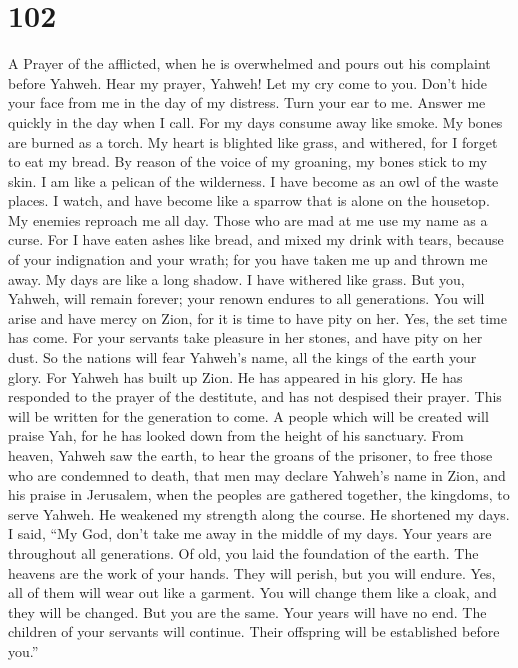\hypertarget{section-92}{%
\section{102}\label{section-92}}

A Prayer of the afflicted, when he is overwhelmed and pours out his
complaint before Yahweh.  Hear my prayer, Yahweh! Let my cry
come to you.  Don't hide your face from me in the day of my
distress. Turn your ear to me. Answer me quickly in the day when I call.
 For my days consume away like smoke. My bones are burned as
a torch.  My heart is blighted like grass, and withered, for
I forget to eat my bread.  By reason of the voice of my
groaning, my bones stick to my skin.  I am like a pelican of
the wilderness. I have become as an owl of the waste places.
 I watch, and have become like a sparrow that is alone on
the housetop.  My enemies reproach me all day. Those who are
mad at me use my name as a curse.  For I have eaten ashes
like bread, and mixed my drink with tears,  because of your
indignation and your wrath; for you have taken me up and thrown me away.
 My days are like a long shadow. I have withered like
grass.  But you, Yahweh, will remain forever; your renown
endures to all generations.  You will arise and have mercy
on Zion, for it is time to have pity on her. Yes, the set time has come.
 For your servants take pleasure in her stones, and have
pity on her dust.  So the nations will fear Yahweh's name,
all the kings of the earth your glory.  For Yahweh has
built up Zion. He has appeared in his glory.  He has
responded to the prayer of the destitute, and has not despised their
prayer.  This will be written for the generation to come. A
people which will be created will praise Yah,  for he has
looked down from the height of his sanctuary. From heaven, Yahweh saw
the earth,  to hear the groans of the prisoner, to free
those who are condemned to death,  that men may declare
Yahweh's name in Zion, and his praise in Jerusalem,  when
the peoples are gathered together, the kingdoms, to serve Yahweh.
 He weakened my strength along the course. He shortened my
days.  I said, ``My God, don't take me away in the middle
of my days. Your years are throughout all generations.  Of
old, you laid the foundation of the earth. The heavens are the work of
your hands.  They will perish, but you will endure. Yes,
all of them will wear out like a garment. You will change them like a
cloak, and they will be changed.  But you are the same.
Your years will have no end.  The children of your servants
will continue. Their offspring will be established before you.''

